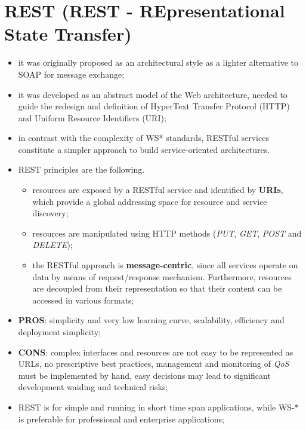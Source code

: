 \documentclass[oneside]{article}
\begin{document}
\section{REST (REST - REpresentational State Transfer)}
\begin{itemize}
    \item it was originally proposed as an architectural style as a lighter alternative to SOAP for message exchange;
    
    \item it was developed as an abstract model of the Web architecture, needed to guide the redesign and definition of HyperText Transfer Protocol (HTTP) and Uniform Resource Identifiers (URI);
    
    \item in contrast with the complexity of WS* standards, RESTful services constitute a simpler approach to build service-oriented architectures.
    
    \item REST principles are the following.
    \begin{itemize}
        \item resources are exposed by a RESTful service and identified by \textbf{URIs}, which provide a global addressing space for resource and service discovery; 
        \item resources are manipulated using HTTP methods (\textit{PUT}, \textit{GET}, \textit{POST} and \textit{DELETE}); 
        \item the RESTful approach is \textbf{message-centric}, since all services operate on data by means of request/response mechanism. Furthermore, resources are decoupled from their representation so that their content can be accessed in various formats;
    \end{itemize}
    
    \item \textbf{PROS}: simplicity and very low learning curve, scalability, efficiency and deployment simplicity;
    \item \textbf{CONS}: complex interfaces and resources are not easy to be represented as URLs, no prescriptive best practices, management and monitoring of \textit{QoS} must be implemented by hand, easy decisions may lead to significant development waiding and technical risks;
    
    \item REST is for simple and running in short time span applications, while WS-* is preferable for professional and enterprise applications;
\end{itemize}
\end{document}
